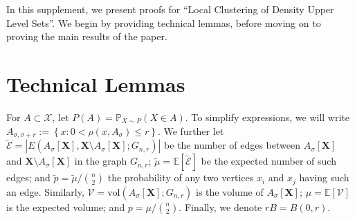 \documentclass{article}
\newcommand{\set}[1]{\left\{#1\right\}}
\newcommand{\vol}{\mathrm{vol}}
\newcommand{\abs}[1]{\left \lvert #1 \right \rvert}
\newcommand{\Asig}{A_{\sigma}}
\newcommand{\1}{\mathbf{1}}
\theoremstyle{aldenthm}
\begin{document}

\printAffiliationsAndNotice{} %

In this supplement, we present proofs for ``Local Clustering of Density Upper Level Sets''. We begin by providing technical lemmas, before moving on to proving the main results of the paper. 

\section{Technical Lemmas}
For $A \subset \mathcal{X}$, let $P(A) = \mathbb{P}_{X \sim P}(X \in A)$. To simplify expressions, we will write $A_{\sigma, \sigma + r} := \set{x: 0 < \rho(x, \Asig) \leq r}$. We further let $\widetilde{\mathcal{E}} = \abs{E(\Asig[\mathbf{X}], \mathbf{X} \setminus \Asig[\mathbf{X}]; G_{n,r})}$ be the number of edges between $\Asig[\mathbf{X}]$ and $\mathbf{X} \setminus \Asig[\mathbf{X}]$ in the graph $G_{n,r}$; $\widetilde{\mu} = \mathbb{E}\left[\widetilde{\mathcal{E}}\right]$ be the expected number of such edges; and $\widetilde{p} = \widetilde{\mu} / {n \choose 2}$ the probability of any two vertices $x_i$ and $x_j$ having such an edge. Similarly, $\mathcal{V} = \vol(\Asig[\mathbf{X}]; G_{n,r})$ is the volume of $\Asig[\mathbf{X}]$; $\mu = \mathbb{E}\left[\mathcal{V}\right]$ is the expected volume; and $p = \mu / {n \choose 2}$. Finally, we denote $rB = B(0,r)$.
\end{document}
